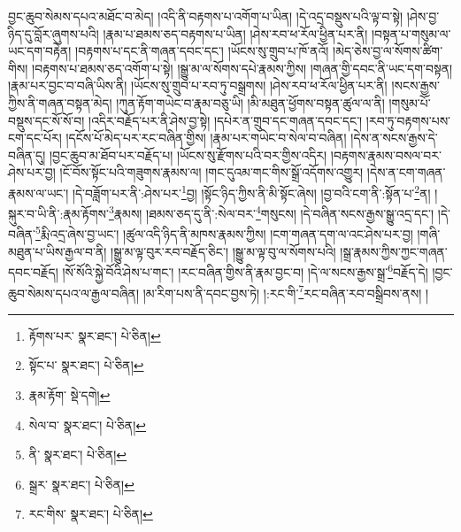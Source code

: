བྱང་ཆུབ་སེམས་དཔའ་མཐོང་བ་མེད། །འདི་ནི་བརྟགས་པ་འགོག་པ་ཡིན། །དེ་འདྲ་བསྡུས་པའི་ལྟ་བ་སྟེ། །ཤེས་བྱ་ཉིད་དུ་བློར་ཞུགས་པའི། །རྣམ་པ་ཐམས་ཅད་བརྟགས་པ་ཡིན། །ཤེས་རབ་ཕ་རོལ་ཕྱིན་པར་ནི། །བསྟན་པ་གསུམ་ལ་ཡང་དག་བརྟེན། །བརྟགས་པ་དང་ནི་གཞན་དབང་དང་། །ཡོངས་སུ་གྲུབ་པ་ཁོ་ནའོ། །མེད་ཅེས་བྱ་ལ་སོགས་ཚིག་གིས། །བརྟགས་པ་ཐམས་ཅད་འགོག་པ་སྟེ། །སྒྱུ་མ་ལ་སོགས་དཔེ་རྣམས་ཀྱིས། །གཞན་གྱི་དབང་ནི་ཡང་དག་བསྟན། །རྣམ་པར་བྱང་བ་བཞི་ཡིས་ནི། །ཡོངས་སུ་གྲུབ་པ་རབ་ཏུ་བསྒྲགས། །ཤེས་རབ་ཕ་རོལ་ཕྱིན་པར་ནི། །སངས་རྒྱས་ཀྱིས་ནི་གཞན་བསྟན་མེད། །ཀུན་རྟོག་གཡེང་བ་རྣམ་བཅུ་ཡི། །མི་མཐུན་ཕྱོགས་བསྟན་ཚུལ་ལ་ནི། །གསུམ་པོ་བསྡུས་དང་སོ་སོ་བ། །འདིར་བརྗོད་པར་ནི་ཤེས་བྱ་སྟེ། །དཔེར་ན་གྲུབ་དང་གཞན་དབང་དང་། །རབ་ཏུ་བརྟགས་པས་ངག་དང་པོར། །དངོས་པོ་མེད་པར་རང་བཞིན་གྱིས། །རྣམ་པར་གཡེང་བ་སེལ་བ་བཞིན། །དེས་ན་སངས་རྒྱས་དེ་བཞིན་དུ། །བྱང་ཆུབ་མ་ཐོབ་པར་བརྗོད་པ། །ཡོངས་སུ་རྫོགས་པའི་བར་གྱིས་འདིར། །བརྟགས་རྣམས་བསལ་བར་ཤེས་པར་བྱ། །ངོ་བོས་སྟོང་པའི་གཟུགས་རྣམས་ལ། །གང་དུའམ་གང་གིས་སྒྲོ་འདོགས་འགྱུར། །དེས་ན་ངག་གཞན་རྣམས་ལ་ཡང་། །དེ་བཟློག་པར་ནི་:ཤེས་པར་\footnote{རྟོགས་པར་  སྣར་ཐང་།  པེ་ཅིན། }བྱ། །སྟོང་ཉིད་ཀྱིས་ནི་མི་སྟོང་ཞེས། །བྱ་བའི་ངག་ནི་:སྟོན་པ་\footnote{སྟོང་པ་  སྣར་ཐང་།  པེ་ཅིན། }ན། །སྐུར་བ་ཡི་ནི་:རྣམ་རྟོགས་\footnote{རྣམ་རྟོག་  སྡེ་དགེ། }རྣམས། །ཐམས་ཅད་དུ་ནི་:སེལ་བར་\footnote{སེལ་བ་  སྣར་ཐང་།  པེ་ཅིན། }གསུངས། །དེ་བཞིན་སངས་རྒྱས་སྒྱུ་འདྲ་དང་། །དེ་བཞིན་\footnote{ནི་  སྣར་ཐང་།  པེ་ཅིན། }རྨི་འདྲ་ཞེས་བྱ་ཡང་། །ཚུལ་འདི་ཉིད་ནི་མཁས་རྣམས་ཀྱིས། །ངག་གཞན་དག་ལ་འང་ཤེས་པར་བྱ། །གཞི་མཐུན་པ་ཡིས་རྒྱལ་བ་ནི། །སྒྱུ་མ་ལྟ་བུར་རབ་བརྗོད་ཅིང་། །སྒྱུ་མ་ལྟ་བུ་ལ་སོགས་པའི། །སྒྲ་རྣམས་ཀྱིས་ཀྱང་གཞན་དབང་བརྗོད། །སོ་སོའི་སྐྱེ་བོའི་ཤེས་པ་གང་། །རང་བཞིན་གྱིས་ནི་རྣམ་བྱང་བ། །དེ་ལ་སངས་རྒྱས་སྒྲ་\footnote{སྒྲར་  སྣར་ཐང་།  པེ་ཅིན། }བརྗོད་དེ། །བྱང་ཆུབ་སེམས་དཔའ་ལ་རྒྱལ་བཞིན། །མ་རིག་པས་ནི་དབང་བྱས་ཏེ། །:རང་གི་\footnote{རང་གིས་  སྣར་ཐང་།  པེ་ཅིན། }རང་བཞིན་རབ་བསྒྲིབས་ནས། །
